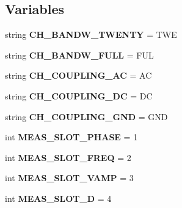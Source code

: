 \subsection*{Variables}
\begin{DoxyCompactItemize}
\item 
\mbox{\label{namespacescope_aef825f7a1c2ed42e9ce813c540c70e63}} 
string {\bfseries C\+H\+\_\+\+B\+A\+N\+D\+W\+\_\+\+T\+W\+E\+N\+TY} = \textquotesingle{}T\+WE\textquotesingle{}
\item 
\mbox{\label{namespacescope_ab9ee49bce7e83cec804a08451b4a74ca}} 
string {\bfseries C\+H\+\_\+\+B\+A\+N\+D\+W\+\_\+\+F\+U\+LL} = \textquotesingle{}F\+UL\textquotesingle{}
\item 
\mbox{\label{namespacescope_ac5b35d02e9c1359908a640afbca32cd3}} 
string {\bfseries C\+H\+\_\+\+C\+O\+U\+P\+L\+I\+N\+G\+\_\+\+AC} = \textquotesingle{}AC\textquotesingle{}
\item 
\mbox{\label{namespacescope_a6277e47afeeabb5657d0792a551209e8}} 
string {\bfseries C\+H\+\_\+\+C\+O\+U\+P\+L\+I\+N\+G\+\_\+\+DC} = \textquotesingle{}DC\textquotesingle{}
\item 
\mbox{\label{namespacescope_a71173c64745ddae7252b4479f62e90a6}} 
string {\bfseries C\+H\+\_\+\+C\+O\+U\+P\+L\+I\+N\+G\+\_\+\+G\+ND} = \textquotesingle{}G\+ND\textquotesingle{}
\item 
\mbox{\label{namespacescope_aef45d151fd0c4eb0035967e1bd8280dd}} 
int {\bfseries M\+E\+A\+S\+\_\+\+S\+L\+O\+T\+\_\+\+P\+H\+A\+SE} = 1
\item 
\mbox{\label{namespacescope_a16dd83a0f40bc374917049009d1b60c7}} 
int {\bfseries M\+E\+A\+S\+\_\+\+S\+L\+O\+T\+\_\+\+F\+R\+EQ} = 2
\item 
\mbox{\label{namespacescope_a5ba772cafdc2344663821e6789155c07}} 
int {\bfseries M\+E\+A\+S\+\_\+\+S\+L\+O\+T\+\_\+\+V\+A\+MP} = 3
\item 
\mbox{\label{namespacescope_a0d79ebccde78bb4eb647d64984b731a4}} 
int {\bfseries M\+E\+A\+S\+\_\+\+S\+L\+O\+T\+\_\+D} = 4

\end{DoxyCompactItemize}
